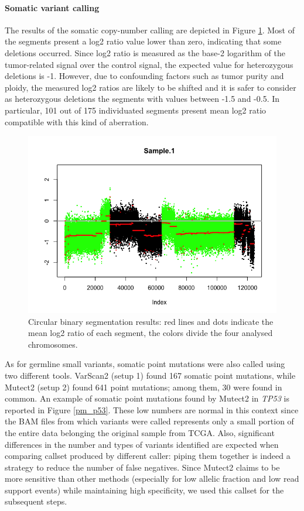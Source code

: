 \documentclass[11pt]{article}
\begin{document}
\paragraph{Somatic variant calling}

The results of the somatic copy-number calling are depicted in Figure \ref{fig:CBS}. Most of the segments present a log2 ratio value lower than zero, indicating that some deletions occurred. Since log2 ratio is measured as the base-2 logarithm of the tumor-related signal over the control signal, the expected value for heterozygous deletions is -1. However, due to confounding factors such as tumor purity and ploidy, the measured log2 ratios are likely to be shifted and it is safer to consider as heterozygous deletions the segments with values between -1.5 and -0.5. In particular, 101 out of 175 individuated segments present mean log2 ratio compatible with this kind of aberration. 

\begin{figure}[H]
\centering
    \centering
    \includegraphics[width=0.8\linewidth]{images/SCNA_calling.png}
    \caption{\label{fig:CBS}\footnotesize{Circular binary segmentation results: red lines and dots indicate the mean log2 ratio of each segment, the colors divide the four analysed chromosomes.}}
\end{figure}

As for germline small variants, somatic point mutations were also called using two different tools. VarScan2 (setup 1) found 167 somatic point mutations, while Mutect2 (setup 2) found 641 point mutations; among them, 30 were found in common. An example of somatic point mutations found by Mutect2 in \emph{TP53} is reported in Figure \ref{pm_p53}. These low numbers are normal in this context since the BAM files from which variants were called represents only a small portion of the entire data belonging the original sample from TCGA. Also, significant differences in the number and types of variants identified are expected when comparing callset produced by different caller: piping them together is indeed a strategy to reduce the number of false negatives. Since Mutect2 claims to be more sensitive than other methods (especially for low allelic fraction and low read support events) while maintaining high specificity, we used this callset for the subsequent steps.
\end{document}
